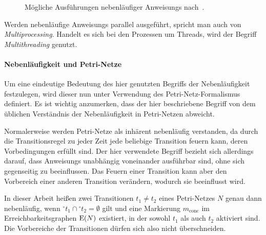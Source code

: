 \begin{figure}[hbt]
\begin{subfigure}{\textwidth}
\end{subfigure}

\caption[Mögliche Ausführungen nebenläufiger .]{Mögliche Ausführungen nebenläufiger \glspl{Anweisung} nach~\cite{Herrtwich1989}.}\label{fig:concAnweisungen}
\end{figure}

Werden nebenläufige \glspl{Anweisung} parallel ausgeführt, spricht man auch von \emph{Multiprocessing}. Handelt es sich bei den Prozessen um Threads, wird der Begriff \emph{Multithreading} genutzt.

\paragraph{Nebenläufigkeit und Petri-Netze}
Um eine eindeutige Bedeutung des hier genutzten Begriffs der Nebenläufigkeit festzulegen, wird dieser nun unter Verwendung des Petri-Netz-Formalismus definiert. Es ist wichtig anzumerken, dass der hier beschriebene Begriff von dem üblichen Verständnis der Nebenläufigkeit in Petri-Netzen abweicht. 

Normalerweise werden Petri-Netze als inhärent nebenläufig verstanden, da durch die Transitionsregel zu jeder Zeit jede beliebige Transition feuern kann, deren Vorbedingungen erfüllt sind. Der hier verwendete Begriff bezieht sich allerdings darauf, dass \glspl{Anweisung} unabhängig voneinander ausführbar sind, ohne sich gegenseitig zu beeinflussen. Das Feuern einer Transition kann aber den Vorbereich einer anderen Transition verändern, wodurch sie beeinflusst wird.

In dieser Arbeit heißen zwei Transitionen $t_1 \neq t_2$ eines Petri-Netzes $N$ genau dann nebenläufig, wenn ${}^\circ t_1 \cap {}^\circ t_2 = \emptyset$ gilt und eine Markierung $m_\text{conc}$ im Erreichbarkeitsgraphen $\operatorname{E}(N)$ existiert, in der sowohl $t_1$ als auch $t_2$ aktiviert sind. Die Vorbereiche der Transitionen dürfen sich also nicht überschneiden.

